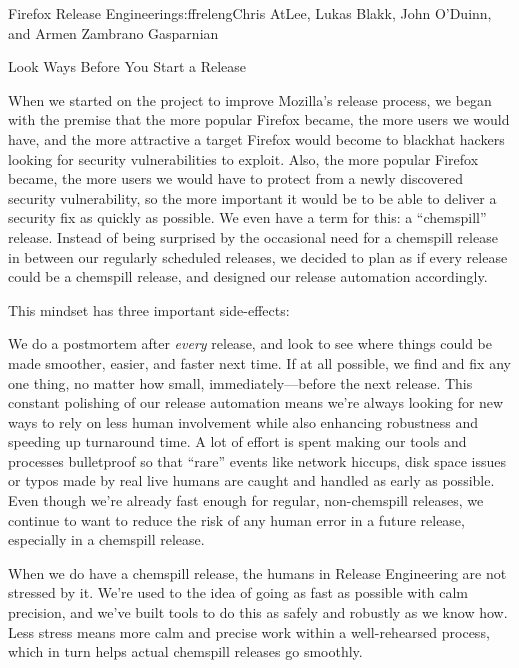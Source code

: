 \begin{aosachapter}{Firefox Release Engineering}{s:ffreleng}{Chris AtLee, Lukas Blakk, John O'Duinn, and Armen Zambrano Gasparnian}
\begin{aosasect1}{Look  Ways Before You Start a Release}

When we started on the project to improve Mozilla's release process,
we began with the premise that the more popular Firefox became, the
more users we would have, and the more attractive a target Firefox would
become to blackhat hackers looking for security vulnerabilities to
exploit. Also, the more popular Firefox became, the more users we
would have to protect from a newly discovered security vulnerability,
so the more important it would be to be able to deliver a security fix as quickly
as possible. We even have a term for this: a ``chemspill''
release. Instead of being surprised by the occasional need for a
chemspill release in between our regularly scheduled releases, we
decided to plan as if every release could be a chemspill release, and
designed our release automation accordingly.

This mindset has three important side-effects:

\begin{aosaenumerate}

\item We do a postmortem after \emph{every} release, and look to see
  where things could be made smoother, easier, and faster next
  time. If at all possible, we find and fix any one thing,
  no matter how small, immediately---before the next release. This constant
  polishing of our release automation means we're always looking for
  new ways to rely on less human involvement while also enhancing
  robustness and speeding up turnaround time. A lot of effort is spent
  making our tools and processes bulletproof so that ``rare'' events
  like network hiccups, disk space issues or typos made by real live
  humans are caught and handled as early as possible.  Even though
  we're already fast enough for regular, non-chemspill releases, we
  continue to want to reduce the risk of any human error in a future
  release, especially in a chemspill release.

\item When we do have a chemspill release, the humans in Release
  Engineering are not stressed by it. We're used to the idea of going
  as fast as possible with calm precision, and we've built tools to do
  this as safely and robustly as we know how. Less stress means more
  calm and precise work within a well-rehearsed process, which in turn
  helps actual chemspill releases go smoothly.


\end{aosaenumerate}
\end{aosasect1}
\end{aosachapter}
